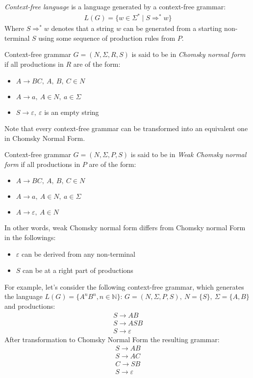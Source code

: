 \begin{definition} \emph{Context-free language} is a language generated by a context-free grammar:
\begin{align*}
     L(G) = \{w \in \Sigma^* \mid S \Rightarrow^* w \} 
\end{align*}
Where $S \Rightarrow^* w$  denotes that a string $w$ can be generated from a starting non-terminal $S$ using some sequence of production rules from $P$.
\end{definition}

\begin{definition} Context-free grammar $G = (N, \Sigma, R, S)$ is said to be in \emph{Chomsky normal form} if all productions in $R$ are of the form:
    \begin{itemize}
        \item $A \rightarrow BC,~A,~B,~C \in N$
        \item  $A \rightarrow a,~A \in N,~a \in \Sigma$
        \item $S \rightarrow \varepsilon,~\varepsilon$ is an empty string
    \end{itemize}
\end{definition}
Note that every context-free grammar can be transformed into an equivalent one in Chomsky Normal Form. 
\begin{definition} Context-free grammar $G = (N, \Sigma, P, S)$ is said to be in \emph{Weak Chomsky normal form} if all productions in $P$ are of the form:
    \begin{itemize}
        \item $A \rightarrow BC,~A,~B,~C \in N$
        \item  $A \rightarrow a,~A \in N,~a \in \Sigma$
        \item $A \rightarrow \varepsilon,~A \in N$
    \end{itemize}
\end{definition}
In other words, weak Chomsky normal form differs from Chomsky normal Form in the followings:
\begin{itemize}
    \item $\varepsilon$ can be derived from any non-terminal
    \item $S$ can be at a right part of productions
\end{itemize}
    
    
For example, let's consider the following context-free grammar, which generates the language $L(G) = \{A^nB^n, n \in \mathbb{N}\}$:
$G=(N, \Sigma, P, S), ~N=\{S\},~\Sigma=\{A,B\}$ and productions: 
\begin{align*}
S \rightarrow AB \\
S \rightarrow ASB\\
S \rightarrow \varepsilon
\end{align*}
After transformation to Chomsky Normal Form the resulting grammar:
\begin{align*}
S \rightarrow AB \\
S \rightarrow AC \\
C \rightarrow SB \\
S \rightarrow \varepsilon
\end{align*}

